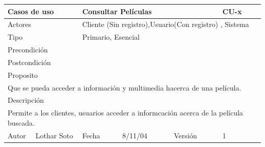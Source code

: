 \documentclass{article}
\begin{document}
\begin{table}[h]
\begin{tabular}{|l|l|l|l|l|l|}
\hline
\multicolumn{2}{|p{2cm}|}{Casos de uso}  & \multicolumn{3}{p{7cm}|}{Consultar Películas} & CU-x \\
\hline
\multicolumn{2}{|p{2cm}|}{Actores}       & \multicolumn{4}{p{8cm}|}{Cliente (Sin registro),Usuario(Con registro) , Sistema}        \\
\hline
\multicolumn{2}{|p{2cm}|}{Tipo}          & \multicolumn{4}{p{8cm}|}{Primario, Esencial}        \\
\hline
\multicolumn{2}{|p{2cm}|}{Precondición}  & \multicolumn{4}{p{8cm}|}{}        \\
\hline
\multicolumn{2}{|p{2cm}|}{Postcondición} & \multicolumn{4}{p{8cm}|}{}        \\
\hline
\multicolumn{6}{|p{10cm}|}{Proposito}                                   \\
\hline
\multicolumn{6}{|p{10cm}|}{Que se pueda acceder a información y multimedia hacerca de una película.}                                            \\
\hline
\multicolumn{6}{|p{10cm}|}{Descripción}                                 \\
\hline
\multicolumn{6}{|p{10cm}|}{Permite a los clientes, usuarios acceder a informcación acerca de la película buscada.}                                            \\
\hline
Autor              &     Lothar Soto         & Fecha    &  8/11/04   &   Versión  & 1\\     
\hline
\end{tabular}
\end{table}
\end{document}
